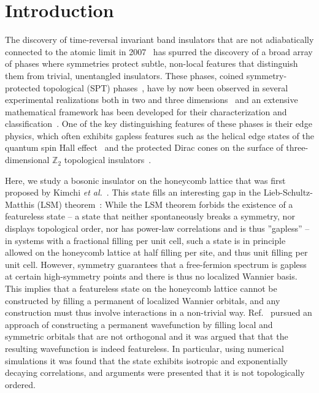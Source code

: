 
\section{Introduction}


The discovery of time-reversal invariant band insulators that are not adiabatically connected to the atomic limit in 2007~\cite{...}
has spurred the discovery of a broad array of phases where symmetries protect subtle, non-local features that distinguish
them from trivial, unentangled insulators. These phases, coined symmetry-protected topological (SPT) phases~\cite{...}, have
by now been observed in several experimental realizations both in two and three dimensions~\cite{somereview} and an extensive
mathematical framework has been developed for their characterization and classification~\cite{wen...}.
One of the key distinguishing features of these phases is their edge physics, which often exhibits gapless features such as
the helical edge states of the quantum spin Hall effect~\cite{...} and the protected Dirac cones on the surface of three-dimensional
$\mathbb{Z}_2$ topological insulators~\cite{...}.

Here, we study a bosonic insulator on the honeycomb lattice that was first proposed by Kimchi {\it et al.}~\cite{kimchi2013}.
This state fills an interesting gap in the Lieb-Schultz-Matthis (LSM) theorem~\cite{...}:
While the LSM theorem forbids the existence of a featureless state
-- a state that neither spontaneously breaks a symmetry, nor displays topological
order, nor has power-law correlations and is thus ''gapless'' -- in systems
with a fractional filling per unit cell, such a state is in principle allowed on the honeycomb lattice
at half filling per site, and thus unit filling per unit cell. However, symmetry guarantees that
a free-fermion spectrum is gapless at certain high-symmetry points and there is
thus no localized Wannier basis.
This implies that a featureless state on the honeycomb lattice cannot be constructed by filling a permanent of localized Wannier
orbitals, and any construction must thus involve interactions in a non-trivial way. Ref.~ pursued
an approach of constructing a permanent wavefunction by filling local and symmetric
orbitals that are not orthogonal and
it was argued that that the resulting wavefunction is indeed featureless.
In particular, using numerical simulations it was found that the state exhibits
isotropic and exponentially decaying correlations, and arguments were presented that it is not
topologically ordered.

